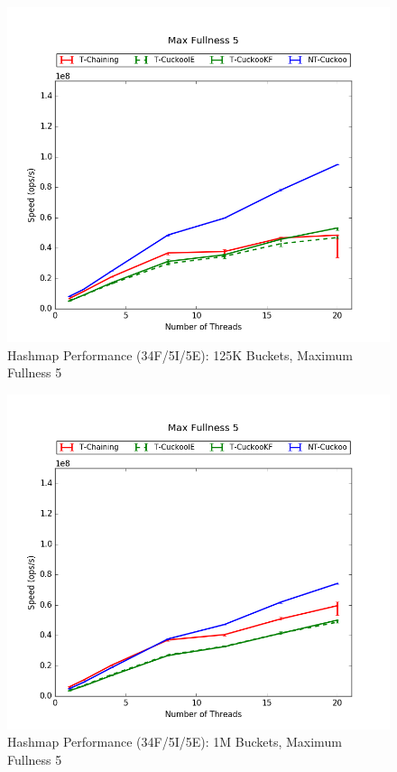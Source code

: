 \begin{figure}[H]
    \centering
	\begin{minipage}{0.5\textwidth}\includegraphics[width=\textwidth]{maps/5HM125K:F90,I5,E5.png} 
    \end{minipage}
	\begin{minipage}{0.4\textwidth}
    
    \end{minipage}
    \caption{Hashmap Performance (34F/5I/5E): 125K Buckets, Maximum Fullness 5}
\end{figure}

\begin{figure}[H]
    \centering
	\begin{minipage}{0.5\textwidth}\includegraphics[width=\textwidth]{maps/5HM1M:F90,I5,E5.png} 
    \end{minipage}
	\begin{minipage}{0.4\textwidth}
    
    \end{minipage}
    \caption{Hashmap Performance (34F/5I/5E): 1M Buckets, Maximum Fullness 5}
\end{figure}

